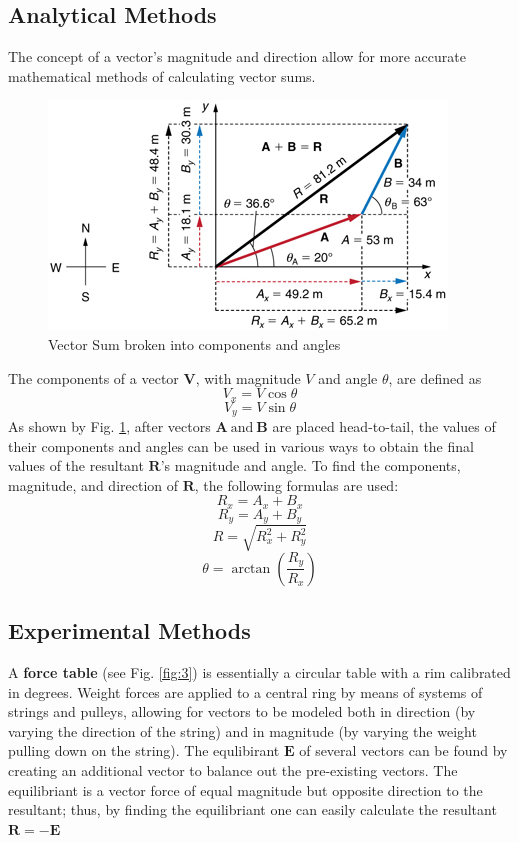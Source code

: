 \documentclass[11pt, titlepage]{article}
\begin{document}
\subsection*{Analytical Methods}
The concept of a vector's magnitude and direction allow for more accurate mathematical methods of calculating vector sums.
\begin{figure}[!ht]
\centering
\includegraphics[scale=1.5, angle=0]{lab03_analyticalvectors.jpg}
\caption{Vector Sum broken into components and angles \label{fig:2}}
\end{figure} 

\noindent The components of a vector $\mathbf{V}$, with magnitude $V$ and angle $\theta$, are defined as
$$ V_x = V \cos\theta$$
\begin{equation} \label{eq:1}
V_y = V \sin\theta
\end{equation}
As shown by Fig. \ref{fig:2}, after vectors $\mathbf{A} ~\text{and} ~\mathbf{B}$ are placed head-to-tail, the values of their components and angles can be used in various ways to obtain the final values of the resultant $\mathbf{R}$'s magnitude and angle. To find the components, magnitude, and direction of $\mathbf{R}$, the following formulas are used:
$$R_x = A_x + B_x$$
$$R_y = A_y + B_y$$
$$R = \sqrt{R_x^2 + R_y^2}$$
\begin{equation} \label{eq:2}
\theta = \arctan({\frac{R_y}{R_x}})
\end{equation}

\subsection*{Experimental Methods}
A \textbf{force table} (see Fig. \ref{fig:3}) is essentially a circular table with a rim calibrated in degrees. Weight forces are applied to a central ring by means of systems of strings and pulleys, allowing for vectors to be modeled  both in direction (by varying the direction of the string) and in magnitude (by varying the weight pulling down on the string). The equlibirant $\mathbf{E}$ of several vectors can be found by creating an additional vector to balance out the pre-existing vectors. The equilibriant is a vector force of equal magnitude but opposite direction to the resultant; thus, by finding the equilibriant one can easily calculate the resultant $\mathbf{R} = -\mathbf{E}$
\end{document}
